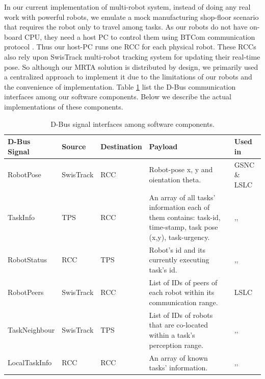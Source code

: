 \documentclass[final,5p,times,twocolumn]{elsarticle}
\begin{document}
In our current implementation of multi-robot system, instead of doing any real work with powerful robots, we emulate a mock manufacturing shop-floor scenario that requires the robot only to travel among tasks. As our robots do not have on-board CPU, they need a host PC to  control them using BTCom communication protocol \cite{Mondada+2009}. Thus our host-PC runs one \acf{RCC} for each physical robot. These RCCs also rely upon SwisTrack multi-robot tracking system \cite{Lochmatter+2008} for updating their real-time pose. So although our MRTA solution is distributed by design, we primarily used a centralized approach to implement it due to the limitations of our robots and the convenience of implementation. Table \ref{table:dbus-signals} list the D-Bus communication interfaces among our software components. Below we describe the actual implementations of these components. 
\begin{table}
\caption{D-Bus signal interfaces among software components.}
\label{table:dbus-signals}
\begin{center}
\begin{tabular}{|l|l|l|p{1.8in}|p{0.5in}|}
\hline D-Bus Signal &  Source & Destination  & Payload & Used in\\ 
\hline RobotPose & SwisTrack & RCC  & Robot-pose x, y and oientation theta. & GSNC \& LSLC\\ 
\hline TaskInfo & TPS & RCC & An array of all tasks' information each of them contains: task-id, time-stamp, task pose (x,y), task-urgency. & ,, \\ 
\hline RobotStatus & RCC & TPS & Robot's id and its currently executing task's id. & ,, \\ 
\hline RobotPeers & SwisTrack & RCC & List of IDs of peers of each robot within its communication range. & LSLC \\ 
\hline TaskNeighbour & SwisTrack & TPS &  List of IDs of robots that are co-located within a task's perception range. & ,,\\ 
\hline LocalTaskInfo & RCC & RCC & An array of known tasks' information. & ,,\\
\hline 
\end{tabular}
\end{center} 
\end{table}
\end{document}
